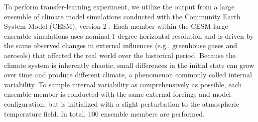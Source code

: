 To perform transfer-learning experiment, we utilize the output from a large ensemble of climate model simulations conducted with the Community Earth System Model (CESM), version 2 \cite{LENS}. Each member within the CESM large ensemble simulations uses nominal 1 degree horizontal resolution and is driven by the same observed changes in external influences (e.g., greenhouse gases and aerosols) that affected the real world over the historical period. Because the climate system is inherently chaotic, small differences in the initial state can grow over time and produce different climate, a phenomenon commonly called internal variability. To sample internal variability as comprehensively as possible, each ensemble member is conducted with the same external forcings and model configuration, but is initialized with a slight perturbation to the atmospheric temperature field. In total, 100 ensemble members are performed. 






